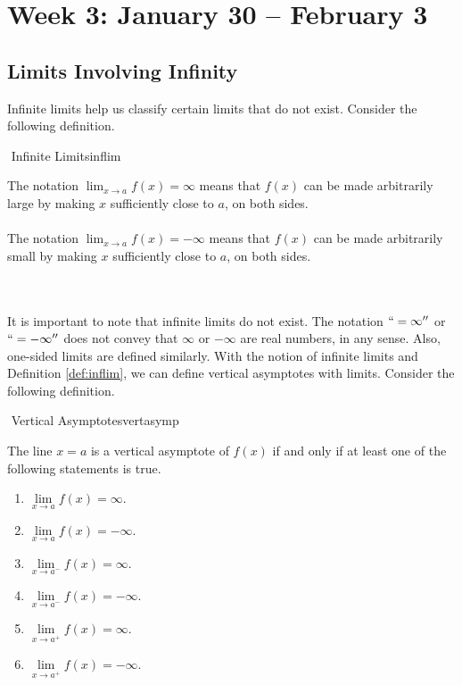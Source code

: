 \pagebreak

\section{Week 3: January 30 -- February 3}

    \subsection{Limits Involving Infinity}

        Infinite limits help us classify certain limits that do not exist. Consider the following definition.
        \begin{definition}{\Stop\,\,Infinite Limits}{inflim}

            The notation \(\lim_{x\to a}f(x)=\infty\) means that \(f(x)\) can be made arbitrarily large by making \(x\) sufficiently close to \(a\), on both sides.
            \\
            \\
            The notation \(\lim_{x\to a}f(x)=-\infty\) means that \(f(x)\) can be made arbitrarily small by making \(x\) sufficiently close to \(a\), on both sides.

        \end{definition}
        \vphantom
        \\
        \\
        It is important to note that infinite limits do not exist. The notation \(``=\infty''\) or \(``=-\infty''\) does not convey that \(\infty\) or \(-\infty\) are real numbers, in any sense. Also, one-sided limits are defined similarly. With the notion of infinite limits and Definition \ref{def:inflim}, we can define vertical asymptotes with limits. Consider the following definition.
        \begin{definition}{\Stop\,\,Vertical Asymptotes}{vertasymp}
            
            The line \(x=a\) is a vertical asymptote of \(f(x)\) if and only if at least one of the following statements is true.
            \begin{enumerate}
                \item \(\lim\limits_{x\to a}f(x)=\infty\).
                \item \(\lim\limits_{x\to a}f(x)=-\infty\).
                \item \(\lim\limits_{x\to a^-}f(x)=\infty\).
                \item \(\lim\limits_{x\to a^-}f(x)=-\infty\).
                \item \(\lim\limits_{x\to a^+}f(x)=\infty\).
                \item \(\lim\limits_{x\to a^+}f(x)=-\infty\).
            \end{enumerate}

        \end{definition}
